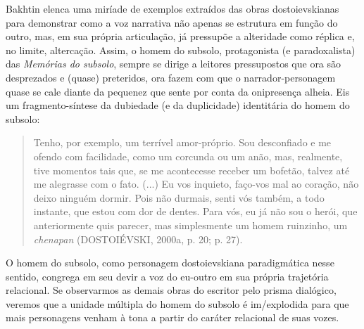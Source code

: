 Bakhtin elenca uma miríade de exemplos extraídos das obras
dostoievskianas para demonstrar como a voz narrativa não apenas se
estrutura em função do outro, mas, em sua própria articulação, já
pressupõe a alteridade como réplica e, no limite, altercação. Assim, o
homem do subsolo, protagonista (e paradoxalista) das \emph{Memórias do
subsolo}, sempre se dirige a leitores pressupostos que ora são
desprezados e (quase) preteridos, ora fazem com que o
narrador-personagem quase se cale diante da pequenez que sente por conta
da onipresença alheia. Eis um fragmento-síntese da dubiedade (e da
duplicidade) identitária do homem do subsolo:

\begin{quote}
Tenho, por exemplo, um terrível amor-próprio. Sou desconfiado e me
ofendo com facilidade, como um corcunda ou um anão, mas, realmente, tive
momentos tais que, se me acontecesse receber um bofetão, talvez até me
alegrasse com o fato. (...) Eu vos inquieto, faço-vos mal ao coração,
não deixo ninguém dormir. Pois não durmais, senti vós também, a todo
instante, que estou com dor de dentes. Para vós, eu já não sou o herói,
que anteriormente quis parecer, mas simplesmente um homem ruinzinho, um
\emph{chenapan} (DOSTOIÉVSKI, 2000a, p. 20; p. 27).
\end{quote}

O homem do subsolo, como personagem dostoievskiana paradigmática nesse
sentido, congrega em seu devir a voz do eu-outro em sua própria
trajetória relacional. Se observarmos as demais obras do escritor pelo
prisma dialógico, veremos que a unidade múltipla do homem do subsolo é
im/explodida para que mais personagens venham à tona a partir do caráter
relacional de suas vozes.

